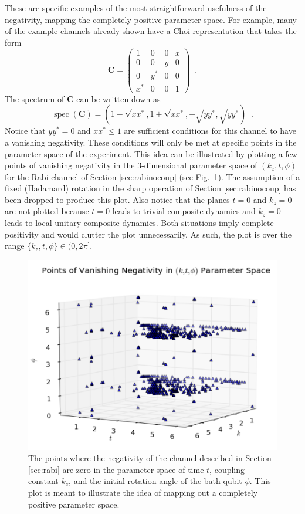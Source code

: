 These are specific examples of the most straightforward usefulness of the negativity, mapping the completely positive parameter space.  For example, many of the example channels already shown have a Choi representation that takes the form
$$
\mathbf{C} = \begin{pmatrix}
1&0&0&x\\
0&0&y&0\\
0&y^*&0&0\\
x^*&0&0&1
 \end{pmatrix}\;\;.
$$
The spectrum of $\mathbf{C}$ can be written down as 
$$
\operatorname{spec}\left(\mathbf{C}\right) = \left( 1-\sqrt{xx^*},1+\sqrt{xx^*},-\sqrt{yy^*},\sqrt{yy^*}\right)\;\;.
 $$
Notice that $yy^*=0$ and $xx^*\le 1$ are sufficient conditions for this channel to have a vanishing negativity.  These conditions will only be met at specific points in the parameter space of the experiment.  This idea can be illustrated by plotting a few points of vanishing negativity in the 3-dimensional parameter space of $(k_z,t,\phi)$ for the Rabi channel of Section \ref{sec:rabinocoup} (see Fig.\ \ref{fig:CPspace}).  The assumption of a fixed (Hadamard) rotation in the sharp operation of Section \ref{sec:rabinocoup} has been dropped to produce this plot.  Also notice that the planes $t=0$ and $k_z=0$ are not plotted because $t=0$ leads to trivial composite dynamics and $k_z=0$ leads to local unitary composite dynamics.  Both situations imply complete positivity and would clutter the plot unnecessarily.  As such, the plot is over the range $\{k_z,t,\phi\}\in(0,2\pi]$.
 
\begin{figure}[th]
\centering
\includegraphics[scale=0.70]{figure9.pdf}
\caption{The points where the negativity of the channel described in Section \ref{sec:rabi} are zero in the parameter space of time $t$, coupling constant $k_z$, and the initial rotation angle of the bath qubit $\phi$.  This plot is meant to illustrate the idea of mapping out a completely positive parameter space.}
 \label{fig:CPspace}
\end{figure} 


